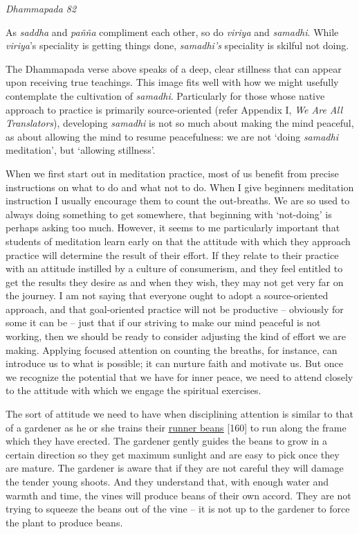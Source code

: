 \emph{Dhammapada 82}

As \emph{saddha} and \emph{pañña} compliment each other, so do
\emph{viriya} and \emph{samadhi}. While \emph{viriya}'s speciality is
getting things done, \emph{samadhi's} speciality is skilful not doing.

The Dhammapada verse above speaks of a deep, clear stillness that can
appear upon receiving true teachings. This image fits well with how we
might usefully contemplate the cultivation of \emph{samadhi}.
Particularly for those whose native approach to practice is primarily
source-oriented (refer Appendix I, \emph{We Are All Translators}),
developing \emph{samadhi} is not so much about making the mind peaceful,
as about allowing the mind to resume peacefulness: we are not `doing
\emph{samadhi} meditation', but `allowing stillness'.

When we first start out in meditation practice, most of us benefit from
precise instructions on what to do and what not to do. When I give
beginners meditation instruction I usually encourage them to count the
out-breaths. We are so used to always doing something to get somewhere,
that beginning with `not-doing' is perhaps asking too much. However, it
seems to me particularly important that students of meditation learn
early on that the attitude with which they approach practice will
determine the result of their effort. If they relate to their practice
with an attitude instilled by a culture of consumerism, and they feel
entitled to get the results they desire as and when they wish, they may
not get very far on the journey. I am not saying that everyone ought to
adopt a source-oriented approach, and that goal-oriented practice will
not be productive -- obviously for some it can be -- just that if our
striving to make our mind peaceful is not working, then we should be
ready to consider adjusting the kind of effort we are making. Applying
focused attention on counting the breaths, for instance, can introduce
us to what is possible; it can nurture faith and motivate us. But once
we recognize the potential that we have for inner peace, we need to
attend closely to the attitude with which we engage the spiritual
exercises.

The sort of attitude we need to have when disciplining attention is
similar to that of a gardener as he or she trains their
\href{https://www.growveg.co.uk/guides/how-to-grow-runner-beans/}{\underline{runner
beans}} {[}160{]} to run along the frame which they have erected. The
gardener gently guides the beans to grow in a certain direction so they
get maximum sunlight and are easy to pick once they are mature. The
gardener is aware that if they are not careful they will damage the
tender young shoots. And they understand that, with enough water and
warmth and time, the vines will produce beans of their own accord. They
are not trying to squeeze the beans out of the vine -- it is not up to
the gardener to force the plant to produce beans.

